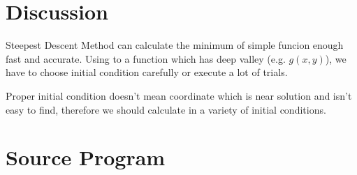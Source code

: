 \documentclass[a4paper,titlepage]{article}
\begin{document}
  \section{Discussion}
  Steepest Descent Method can calculate the minimum of simple funcion enough fast and accurate.
  Using to a function which has deep valley (e.g. $g(x,y)$), we have to choose initial condition carefully or execute a lot of trials.

  Proper initial condition doesn't mean coordinate which is near solution and isn't easy to find,
  therefore we should calculate in a variety of initial conditions.

  \section{Source Program}
  
\end{document}
